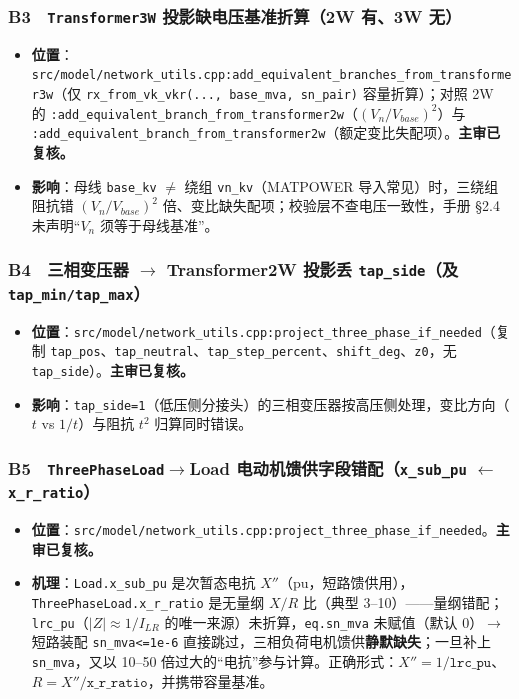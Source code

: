 \documentclass[11pt,a4paper,fontset=fandol]{ctexart}
\newcommand{\file}[1]{\texttt{#1}}
\begin{document}
\subsubsection*{B3　\texttt{Transformer3W} 投影缺电压基准折算（2W 有、3W 无）}
\begin{itemize}
  \item \textbf{位置}：\file{src/model/network\_utils.cpp:add\_equivalent\_branches\_from\_transformer3w}（仅 \texttt{rx\_from\_vk\_vkr(..., base\_mva, sn\_pair)} 容量折算）；对照 2W 的 \file{:add\_equivalent\_branch\_from\_transformer2w}（$(V_n/V_{base})^2$）与 \file{:add\_equivalent\_branch\_from\_transformer2w}（额定变比失配项）。\textbf{主审已复核。}
  \item \textbf{影响}：母线 \texttt{base\_kv} $\neq$ 绕组 \texttt{vn\_kv}（MATPOWER 导入常见）时，三绕组阻抗错 $(V_n/V_{base})^2$ 倍、变比缺失配项；校验层不查电压一致性，手册 \S 2.4 未声明``$V_n$ 须等于母线基准''。
\end{itemize}

\subsubsection*{B4　三相变压器 $\to$ Transformer2W 投影丢 \texttt{tap\_side}（及 \texttt{tap\_min/tap\_max}）}
\begin{itemize}
  \item \textbf{位置}：\file{src/model/network\_utils.cpp:project\_three\_phase\_if\_needed}（复制 \texttt{tap\_pos}、\texttt{tap\_neutral}、\texttt{tap\_step\_percent}、\texttt{shift\_deg}、\texttt{z0}，无 \texttt{tap\_side}）。\textbf{主审已复核。}
  \item \textbf{影响}：\texttt{tap\_side=1}（低压侧分接头）的三相变压器按高压侧处理，变比方向（$t$ vs $1/t$）与阻抗 $t^2$ 归算同时错误。
\end{itemize}

\subsubsection*{B5　\texttt{ThreePhaseLoad}$\to$Load 电动机馈供字段错配（\texttt{x\_sub\_pu} $\leftarrow$ \texttt{x\_r\_ratio}）}
\begin{itemize}
  \item \textbf{位置}：\file{src/model/network\_utils.cpp:project\_three\_phase\_if\_needed}。\textbf{主审已复核。}
  \item \textbf{机理}：\texttt{Load.x\_sub\_pu} 是次暂态电抗 $X''$（pu，短路馈供用），\texttt{ThreePhaseLoad.x\_r\_ratio} 是无量纲 $X/R$ 比（典型 3--10）——量纲错配；\texttt{lrc\_pu}（$|Z|\approx 1/I_{LR}$ 的唯一来源）未折算，\texttt{eq.sn\_mva} 未赋值（默认 0）$\to$ 短路装配 \texttt{sn\_mva<=1e-6} 直接跳过，三相负荷电机馈供\textbf{静默缺失}；一旦补上 \texttt{sn\_mva}，又以 10--50 倍过大的``电抗''参与计算。正确形式：$X'' = 1/\texttt{lrc\_pu}$、$R = X''/\texttt{x\_r\_ratio}$，并携带容量基准。
\end{itemize}
\end{document}
